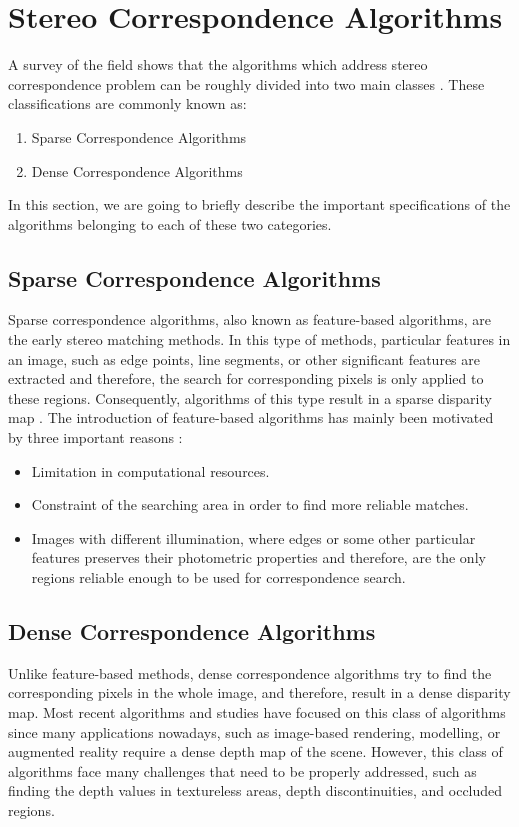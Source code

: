 \documentclass[dvips,letterpaper,12pt]{report}
\begin{document}
\section{Stereo Correspondence Algorithms}
A survey of the field shows that the algorithms which address stereo correspondence problem can be roughly divided into two main classes \cite{sch02}. These classifications are commonly known as:
\begin{enumerate}
\item Sparse Correspondence Algorithms
\item Dense Correspondence Algorithms 
\end{enumerate}

In this section, we are going to briefly describe the important specifications of the algorithms belonging to each of these two categories.
\subsection{Sparse Correspondence Algorithms}
Sparse correspondence algorithms, also known as feature-based algorithms, are the early stereo matching methods. In this type of methods, particular features in an image, such as edge 
points, line segments, or other significant features are extracted and therefore, the search for corresponding pixels is only applied to these regions. Consequently, algorithms of this
type result in a sparse disparity map \cite{matt89,hsie92, sze11}. The introduction of feature-based algorithms has mainly been motivated by three important reasons \cite{sze11}:
\begin{itemize}
\item Limitation in computational resources.
\item Constraint of the searching area in order to find more reliable matches.
\item Images with different illumination, where edges or some other particular features preserves their photometric properties and therefore, are the only regions reliable enough to 
be used for correspondence search.
\end{itemize}

\subsection{Dense Correspondence Algorithms}
Unlike feature-based methods, dense correspondence algorithms try to find the
corresponding pixels in the whole image, and therefore, result in a dense disparity map. Most recent algorithms and studies have focused on this class of algorithms since many applications 
nowadays, such as image-based rendering, modelling, or augmented reality require a dense depth map of the scene. However, this class of algorithms face many challenges that need to be properly
addressed, such as finding the depth values in textureless areas, depth discontinuities, and occluded regions.
\end{document}
